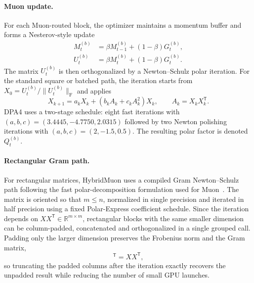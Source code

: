 \paragraph{Muon update.}
For each Muon-routed block, the optimizer maintains a momentum buffer and forms
a Nesterov-style update
\begin{align}
    M_t^{(b)} & = \beta M_{t-1}^{(b)}+(1-\beta)G_t^{(b)}, \\ U_t^{(b)} & = \beta M_t^{(b)}+(1-\beta)G_t^{(b)}.
    \label{eq:sm-muon-nesterov}
\end{align}
The matrix $U_t^{(b)}$ is then orthogonalized by a Newton--Schulz polar iteration.
For the standard square or batched path, the iteration starts from
$X_0=U_t^{(b)}/\|U_t^{(b)}\|_{\mathrm{F}}$ and applies
\begin{equation}
    X_{k+1} = a_k X_k + \left(b_k A_k+c_k A_k^2\right)X_k, \qquad A_k=X_kX_k^{\mathsf{T}}.
    \label{eq:sm-newton-schulz}
\end{equation}
DPA4 uses a two-stage schedule: eight fast iterations with $(a,b,c)=(3.4445,-4.7750,2.0315)$ followed by two Newton polishing iterations with $(a,b,c)=(2,-1.5,0.5)$.
The resulting polar factor is denoted $Q_t^{(b)}$.

\paragraph{Rectangular Gram path.}
For rectangular matrices, HybridMuon uses a compiled Gram Newton--Schulz path following the fast polar-decomposition formulation used for Muon~\cite{dao2026gramnewtonschulz}.
The matrix is oriented so that $m\le n$, normalized in single precision and iterated in half precision using a fixed Polar-Express coefficient schedule.
Since the iteration depends on $XX^{\mathsf{T}}\in\mathbb{R}^{m\times m}$, rectangular blocks with the same smaller dimension can be column-padded, concatenated and orthogonalized in a single grouped call.
Padding only the larger dimension preserves the Frobenius
norm and the Gram matrix,
\begin{equation}
    [X\;0][X\;0]^{\mathsf{T}}=XX^{\mathsf{T}},
    \label{eq:sm-gram-padding}
\end{equation}
so truncating the padded columns after the iteration exactly recovers the
unpadded result while reducing the number of small GPU launches.

